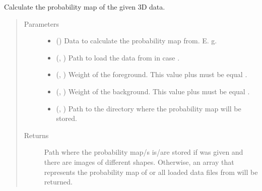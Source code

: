 \documentclass[letterpaper,10pt,english]{sphinxmanual}
\begin{document}
\begin{fulllineitems}
\label{\detokenize{utils/util:utils.util.calculate_3D_volume_prob_map}}
Calculate the probability map of the given 3D data.
\begin{quote}\begin{description}
\item[{Parameters}] \leavevmode\begin{itemize}
\item {} 
 () \textendash{} Data to calculate the probability map from. E. g. 

\item {} 
 (, ) \textendash{} Path to load the data from in case .

\item {} 
 (, ) \textendash{} Weight of the foreground. This value plus  must be equal .

\item {} 
 (, ) \textendash{} Weight of the background. This value plus  must be equal .

\item {} 
 (, ) \textendash{} Path to the directory where the probability map will be stored.

\end{itemize}

\item[{Returns}] \leavevmode
{} \textendash{} Path where the probability map/s is/are stored if  was given and there are images of different
shapes. Otherwise, an array that represents the probability map of  or all loaded data files from
 will be returned.


\end{description}
\end{quote}
\end{fulllineitems}
\end{document}
